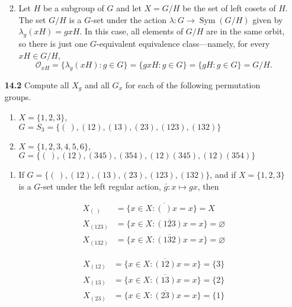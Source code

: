 \documentclass[12pt,reqno]{amsart}
\newcommand{\<}{\ensuremath{\langle}}
\renewcommand{\>}{\ensuremath{\rangle}}
\renewcommand{\emptyset}{\ensuremath{\varnothing}}
\newcommand{\Sym}{\ensuremath{\operatorname{Sym}}}
\begin{document}
\begin{enumerate}
\begin{enumerate}
 \medskip
 
\item
Let $H$ be a subgroup of $G$ and let $X = G/H$ be the set of left cosets
of $H$.  The set $G/H$ is a $G$-set under the action
$\lambda: G \rightarrow \Sym(G/H)$ given by 
$\lambda_g(xH) = gxH$.
In this case, all elements of $G/H$ are in the same orbit, so there is just one
$G$-equivalent equivalence class---namely, for every $xH \in G/H$, 
\[
\mathcal{O}_{xH} = \{\lambda_g(xH) : g \in G\} = \{gxH : g \in G\} = 
\{gH : g \in G\} = G/H.
\]
\end{enumerate}

\bigskip

\item[{\bf 14.2}] \label{actions}
Compute all $X_g$ and all $G_x$ for each of the following permutation
groups. 
\begin{enumerate}
 
 \item
$X= \{1, 2, 3\}$, \\
$G=S_3=\{(~), (12), (13), (23), (123), (132)  \}$
 
 \item
$X = \{1, 2, 3, 4, 5, 6\}$, \\
$G = \{(~), (12), (345), (354), (12)(345), (12)(354)  \}$
 
\end{enumerate}

\medskip


\begin{enumerate}
 
 \item If
$G=\{(~), (12), (13), (23), (123), (132)  \}$, and 
if $X= \{1, 2, 3\}$ is a $G$-set under the left regular action, 
$\bar{g}: x\mapsto gx$, then
 \setlength\multicolsep{0pt}
\begin{multicols}{2}
   \begin{align*}
     X_{(~)} &= \{x\in X : \overline{(~)} x = x\} = X\\
     X_{(123)} &= \{x\in X : \overline{(123)} x = x\} = \emptyset\\
     X_{(132)} &= \{x\in X : \overline{(132)} x = x\} = \emptyset
   \end{align*}

\columnbreak

   \begin{align*}
     X_{(12)} &= \{x\in X : \overline{(12)} x = x\} = \{3\}\\
     X_{(13)} &= \{x\in X : \overline{(13)} x = x\} = \{2\}\\
     X_{(23)} &= \{x\in X : \overline{(23)} x = x\} = \{1\}
   \end{align*}
\end{multicols}


\end{enumerate}
\end{enumerate}
\end{document}
